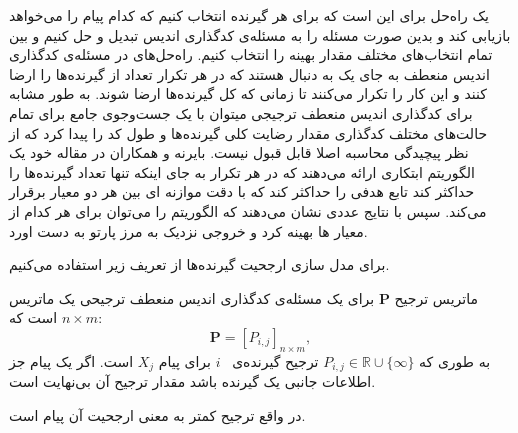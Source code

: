  یک راه‌حل 
 برای 
 \picod
  این است که برای هر گیرنده انتخاب کنیم که کدام پیام را می‌خواهد بازیابی کند و بدین صورت مسئله را به مسئله‌ی کدگذاری اندیس تبدیل و حل کنیم و بین تمام انتخاب‌های مختلف مقدار بهینه را انتخاب کنیم.  راه‌حل‌های
 در مسئله‌ی کدگذاری اندیس منعطف به جای یک 
به دنبال 
هستند که در هر تکرار تعداد
از گیرنده‌ها را ارضا کنند و این کار را تکرار می‌کنند تا زمانی که کل گیرنده‌ها ارضا شوند. به طور مشابه برای کدگذاری اندیس منعطف ترجیجی میتوان با یک جست‌وجوی جامع برای تمام حالت‌های مختلف کدگذاری مقدار رضایت کلی گیرنده‌ها و طول کد را پیدا کرد که از نظر پیچیدگی محاسبه اصلا قابل قبول نیست. بایرنه و همکاران در مقاله خود یک الگوریتم ابتکاری ارائه می‌دهند که در هر تکرار به جای اینکه تنها تعداد گیرنده‌ها را حداکثر کند تابع هدفی را حداکثر کند که با دقت موازنه ای بین هر دو معیار برقرار می‌کند. سپس با نتایج عددی نشان می‌دهند که الگوریتم را می‌توان برای هر کدام از معیار ها بهینه کرد و خروجی نزدیک به مرز پارتو به دست اورد.

برای مدل سازی ارجحیت گیرنده‌ها از تعریف زیر استفاده می‌کنیم.
\begin{definition}
	ماتریس ترجیح
	$\boldsymbol{P}$ 
	برای یک مسئله‌ی کدگذاری اندیس منعطف ترجیحی یک ماتریس
	 $n\times m$
	 است که:
	\begin{equation}
		\boldsymbol{P} = [P_{i,j}]_{n\times m},
	\end{equation}
	به طوری که
	 $P_{i,j}\in\mathbb{R}\cup\{\infty\}$ 
	 ترجیح گیرنده‌ی
	 ~$i$
	 برای پیام
	  $X_j$
	  است.
	اگر یک پیام جز اطلاعات جانبی یک گیرنده باشد مقدار ترجیح آن بی‌نهایت است.
	
	در واقع ترجیح کمتر به معنی ارجحیت آن پیام است.
\end{definition}

